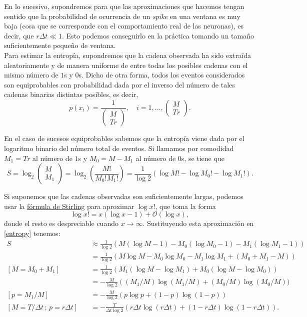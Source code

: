 \documentclass[11pt,a4paper]{article}
\begin{document}
En lo sucesivo, supondremos para que las aproximaciones que hacemos tengan sentido que la probabilidad de ocurrencia de un \textit{spike} en una ventana es muy baja (cosa que se corresponde con el comportamiento real de las neuronas), es decir, que $r\Delta t \ll 1$. Esto podemos conseguirlo en la práctica tomando un tamaño suficientemente pequeño de ventana.\\

Para estimar la entropía, supondremos que la cadena observada ha sido extraída aleatoriamente y de manera uniforme de entre todas los posibles cadenas con el mismo número de $1$s y $0$s. Dicho de otra forma, todos los eventos considerados son equiprobables con probabilidad dada por el inverso del número de tales cadenas binarias distintas posibles, es decir,
\[
p(x_i) = \frac{1}{\begin{pmatrix}
  M\\Tr
\end{pmatrix}}, \quad i = 1, \dots, \begin{pmatrix}
  M\\Tr
\end{pmatrix}.
\]

En el caso de sucesos equiprobables sabemos que la entropía viene dada por el logaritmo binario del número total de eventos. Si llamamos por comodidad $M_1=Tr$ al número de $1$s y $M_0=M-M_1$ al número de $0$s, se tiene que
\begin{equation}
  \label{entropy}
S=\log_2 \begin{pmatrix}
  M\\ M_1
\end{pmatrix} = \log_2 \left(\frac{M!}{M_0!M_1!}\right) = \frac{1}{\log 2}(\log M! - \log M_0! - \log M_1!).
\end{equation}

Si suponemos que las cadenas observadas son suficientemente largas, podemos usar la \href{https://en.wikipedia.org/wiki/Stirling%27s_approximation}{fórmula de Stirling} para aproximar $\log x!$, que toma la forma
\[
\log x! = x(\log x - 1) + \mathcal{O}(\log x),
\]
donde el resto es despreciable cuando $x\to \infty$. Sustituyendo esta aproximación en \eqref{entropy} tenemos:
\begin{align*}
  S &\approx \frac{1}{\log 2}(M(\log M - 1) - M_0(\log M_0 - 1) - M_1(\log M_1 - 1))\\
  &= \frac{1}{\log 2}(M\log M - M_0\log M_0 - M_1\log M_1 + (M_0 + M_1 - M))\\
  [M=M_0+M_1] \quad &= \frac{1}{\log 2}(M_1(\log M - \log M_1) + M_0(\log M - \log M_0))\\
  &= - \frac{M}{\log 2}\left((M_1/M)\log(M_1/M) + (M_0/M)\log(M_0/M))\\
  [p=M_1/M]\quad &= - \frac{M}{\log 2} (p\log p + (1-p)\log(1-p))\\
  \tag{2}
  \label{eq}
  [M=T/\Delta t\, ; \,p=r\Delta t]\quad&= - \frac{T}{\Delta t \log 2}(r\Delta t \log(r\Delta t) + (1 - r\Delta t)\log(1 - r\Delta t)).
\end{align*}
\end{document}
